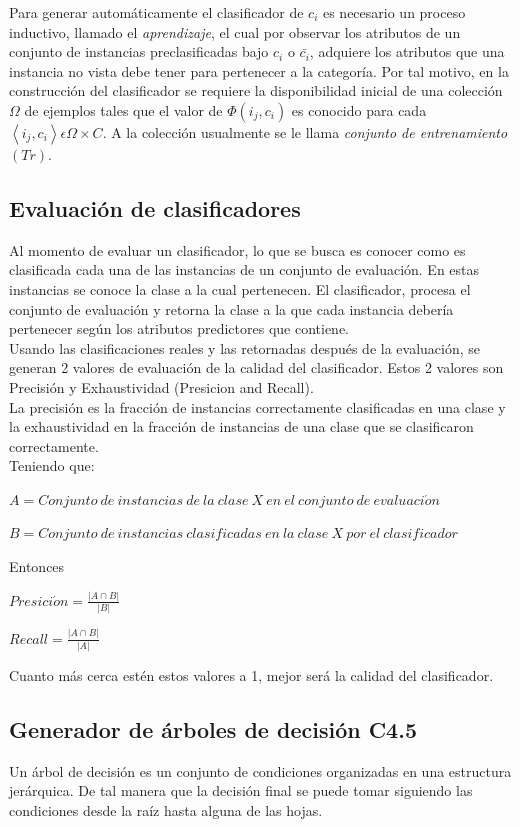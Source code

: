 Para generar automáticamente el clasificador de $c_{i}$ es necesario
un proceso inductivo, llamado el \emph{aprendizaje}, el cual por observar
los atributos de un conjunto de instancias preclasificadas bajo $c_{i}$
o $\bar{c_{i}}$, adquiere los atributos que una instancia no vista
debe tener para pertenecer a la categoría. Por tal motivo, en la construcción
del clasificador se requiere la disponibilidad inicial de una colección
$\Omega$ de ejemplos tales que el valor de $\Phi\left(i_{j},c_{i}\right)$
es conocido para cada $\left\langle i_{j},c_{i}\right\rangle \epsilon\Omega\times C$.
A la colección usualmente se le llama \emph{conjunto de entrenamiento}
$\left(Tr\right)$.
\subsection{Evaluación de clasificadores}
Al momento de evaluar un clasificador, lo que se busca es conocer como es clasificada cada una de las instancias de un conjunto de evaluación. En estas instancias se conoce la clase a la cual pertenecen. El clasificador, procesa el conjunto de evaluación y retorna la clase a la que cada instancia debería pertenecer según los atributos predictores que contiene.\\
Usando las clasificaciones reales y las retornadas después de la evaluación, se generan 2 valores de evaluación de la calidad del clasificador. Estos 2 valores son Precisión y Exhaustividad (Presicion and Recall).\\
La precisión es la fracción de instancias correctamente clasificadas en una clase y la exhaustividad en la fracción de instancias de una clase que se clasificaron correctamente. \cite{key-280}\\
Teniendo que:
\begin{center}
$A=Conjunto\ de\  instancias\  de\  la\  clase\  X\  en\  el\  conjunto\  de\  evaluaci\acute{o}n$

$B=Conjunto\  de\  instancias\  clasificadas\  en\  la\  clase\  X\  por\  el\  clasificador$
\end{center}
Entonces
\begin{center}
$Presici\acute{o}n=\frac{|A\cap B|}{|B|}$

$Recall=\frac{|A\cap B|}{|A|}$
\end{center}
Cuanto más cerca estén estos valores a 1, mejor será la calidad del clasificador.
\subsection{Generador de árboles de decisión C4.5}
Un árbol de decisión es un conjunto de condiciones organizadas en una estructura jerárquica. De tal manera que la decisión final se puede tomar siguiendo las condiciones desde la raíz hasta alguna de las hojas\cite{key-170}.

